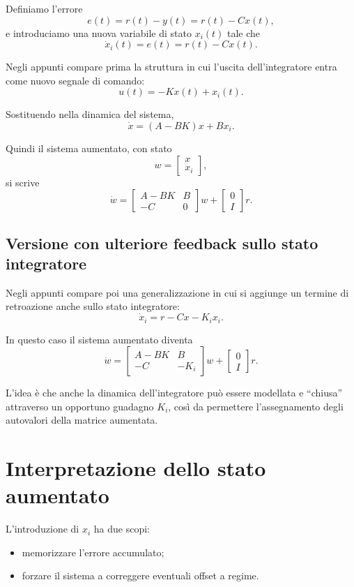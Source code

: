 Definiamo l'errore
\[
e(t)=r(t)-y(t)=r(t)-Cx(t),
\]
e introduciamo una nuova variabile di stato \(x_i(t)\) tale che
\[
\dot x_i(t)=e(t)=r(t)-Cx(t).
\]

Negli appunti compare prima la struttura in cui l'uscita dell'integratore entra come nuovo segnale di comando:
\[
u(t)=-Kx(t)+x_i(t).
\]

Sostituendo nella dinamica del sistema,
\[
\dot x=(A-BK)x+Bx_i.
\]

Quindi il sistema aumentato, con stato
\[
w=
\begin{bmatrix}
x\\
x_i
\end{bmatrix},
\]
si scrive
\[
\dot w
=
\begin{bmatrix}
A-BK & B\\
-C & 0
\end{bmatrix}
w
+
\begin{bmatrix}
0\\
I
\end{bmatrix}r.
\]

\subsection{Versione con ulteriore feedback sullo stato integratore}

Negli appunti compare poi una generalizzazione in cui si aggiunge un termine di retroazione anche sullo stato integratore:
\[
\dot x_i=r-Cx-K_i x_i.
\]

In questo caso il sistema aumentato diventa
\[
\dot w
=
\begin{bmatrix}
A-BK & B\\
-C & -K_i
\end{bmatrix}
w
+
\begin{bmatrix}
0\\
I
\end{bmatrix}r.
\]

L'idea è che anche la dinamica dell'integratore può essere modellata e ``chiusa''
attraverso un opportuno guadagno \(K_i\), così da permettere l'assegnamento
degli autovalori della matrice aumentata.

\section{Interpretazione dello stato aumentato}

L'introduzione di \(x_i\) ha due scopi:
\begin{itemize}
    \item memorizzare l'errore accumulato;
    \item forzare il sistema a correggere eventuali offset a regime.
\end{itemize}

